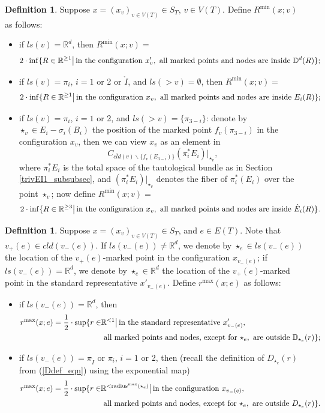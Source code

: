 \documentclass[11pt]{article}
\theoremstyle{definition}
\newtheorem{dfn}[thm]{Definition}
\theoremstyle{remark}
\def\ov#1{\overline{#1}}
\def\mr#1{{\mathring{#1}}}
\def\R{\mathbb{R}}
\def\D{\mathbb{D}}
\def\rI{{\mathring{I}}}
\def\tn#1{\textnormal{#1}}
\begin{document}
\begin{dfn}\label{Rmin_dfn}
Suppose $x=(x_v)_{v\in V(T)}\in S_T$, $v\in V(T)$. 
Define $R^{\min}(x;v)$ as follows: 
\begin{itemize}
\item if $ls(v)=\R^d$, then $R^{\min}(x;v)=$
$$2\cdot\inf\{R\in\R^{\ge1}\big|\,\tn{in the configuration }x'_v,\tn{ all marked points and nodes are inside }\D^d(R)\};$$
\item if $ls(v)=\pi_i$, $i=1$ or 2 or $\mr{I}$, and $ls(>v)=\emptyset$, 
then $R^{\min}(x;v)=$
$$2\cdot\inf\{R\in\R^{\ge1}\big|\,\tn{in the configuration }x_v,\tn{ all marked points and nodes are inside }E_i(R)\};$$
\item if $ls(v)=\pi_i$, $i=1$ or 2, and $ls(>v)=\{\pi_{3-i}\}$: denote by $\star_v\in E_i-\sigma_i(B_i)$ the position of the marked point $f_v(\pi_{3-i})$ in the configuration $x_v$, then we can view $x_v$ as an element in 
$$C_{\ov{cld}(v)\backslash\{f_v(E_{3-i})\}}(\pi_i^*E_i)|_{\star_v},$$
where $\pi_i^*E_i$ is the total space of 
the tautological bundle as in Section \ref{trivEI1_subsubsec}, and $(\pi_i^*E_i)|_{\star_v}$ denotes the fiber of $\pi_i^*(E_i)$ over the point $\star_v$;
now define $R^{\min}(x;v)=$
$$2\cdot\inf\{R\in\R^{\ge3}\big|\,\tn{in the configuration }x_v,\tn{ all marked points and nodes are inside }\hat E_i(R)\}.$$
\end{itemize}
\end{dfn}

\begin{dfn}\label{rmax_dfn}
Suppose $x=(x_v)_{v\in V(T)}\in S_T$, and $e\in E(T)$. Note that $v_+(e)\in cld(v_-(e))$. If $ls(v_-(e))\neq\R^d$, we denote by $\star_e\in ls(v_-(e))$ the location of the $v_+(e)$-marked point in the configuration $x_{v_-(e)}$; if $ls(v_-(e))=\R^d$, we denote by $\star_e\in\R^d$ the location of the $v_+(e)$-marked point in the standard representative $x'_{v_-(e)}$. 
Define $r^{\max}(x;e)$ as follows:
\begin{itemize}
\item if $ls(v_-(e))=\R^d$, then 
\begin{align*}
r^{\max}(x;e)=\frac{1}{2}\cdot\sup\{r\in&\R^{<1}\big|\,\tn{in the standard representative }x'_{v_-(e)},\\
&\tn{ all marked points and nodes, except for }\star_e, \tn{ are outside }\D_{\star_e}(r)\};
\end{align*}
\item if $ls(v_-(e))=\pi_\rI$ or $\pi_i$, $i=1$ or 2, 
then (recall the definition of $D_{\star_e}(r)$ from (\ref{Ddef_eqn}) using the exponential map)
\begin{align*}
r^{\max}(x;e)=\frac{1}{2}\cdot\sup\{r\in&\R^{<\tn{radius}^{\max}(\star_e)}\big|\,\tn{in the configuration }x_{v_-(e)},\\
&\tn{ all marked points and nodes, except for }\star_e, \tn{ are outside }D_{\star_e}(r)\}.
\end{align*}
\end{itemize}
\end{dfn}
\end{document}

